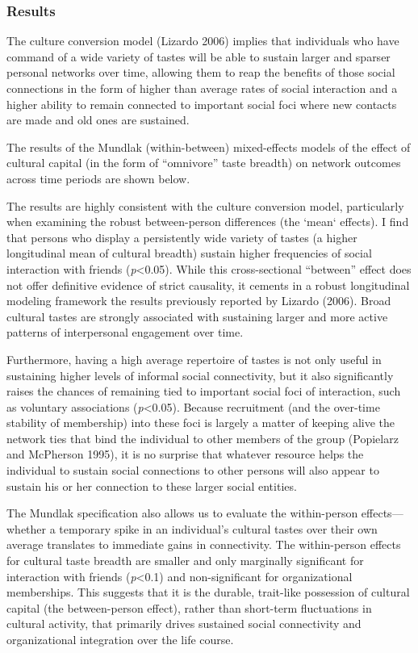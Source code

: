 \documentclass[
]{article}
\begin{document}
\subsubsection{Results}\label{results-1}

The culture conversion model (Lizardo 2006) implies that individuals who have command of a wide variety of tastes will be able to sustain larger and sparser personal networks over time, allowing them to reap the benefits of those social connections in the form of higher than average rates of social interaction and a higher ability to remain connected to important social foci where new contacts are made and old ones are sustained. 

The results of the Mundlak (within-between) mixed-effects models of the effect of cultural capital (in the form of ``omnivore'' taste breadth) on network outcomes across time periods are shown below.



The results are highly consistent with the culture conversion model, particularly when examining the robust between-person differences (the `mean` effects). I find that persons who display a persistently wide variety of tastes (a higher longitudinal mean of cultural breadth) sustain higher frequencies of social interaction with friends (\emph{p}\textless0.05). While this cross-sectional ``between'' effect does not offer definitive evidence of strict causality, it cements in a robust longitudinal modeling framework the results previously reported by Lizardo (2006). Broad cultural tastes are strongly associated with sustaining larger and more active patterns of interpersonal engagement over time. 

Furthermore, having a high average repertoire of tastes is not only useful in sustaining higher levels of informal social connectivity, but it also significantly raises the chances of remaining tied to important social foci of interaction, such as voluntary associations (\emph{p}\textless0.05). Because recruitment (and the over-time stability of membership) into these foci is largely a matter of keeping alive the network ties that bind the individual to other members of the group (Popielarz and McPherson 1995), it is no surprise that whatever resource helps the individual to sustain social connections to other persons will also appear to sustain his or her connection to these larger social entities.

The Mundlak specification also allows us to evaluate the within-person effects---whether a temporary spike in an individual's cultural tastes over their own average translates to immediate gains in connectivity. The within-person effects for cultural taste breadth are smaller and only marginally significant for interaction with friends (\emph{p}\textless0.1) and non-significant for organizational memberships. This suggests that it is the durable, trait-like possession of cultural capital (the between-person effect), rather than short-term fluctuations in cultural activity, that primarily drives sustained social connectivity and organizational integration over the life course.
\end{document}
